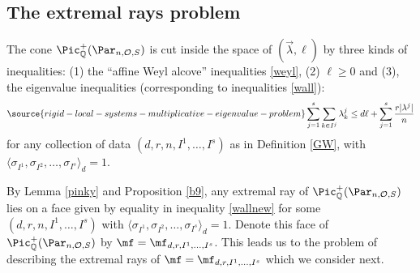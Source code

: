\subsection{The extremal rays problem}
The cone  $\Pic^+_{\Bbb{Q}}(\Par_{n,\mathcal{O},S})$ is cut inside the space of $(\vec{\lambda},\ell)$ by three kinds of inequalities: (1) the ``affine Weyl alcove''  inequalities \eqref{weyl}, (2)
$\ell\geq 0$ and (3), the eigenvalue inequalities (corresponding to inequalities \eqref{wall}):
\begin{equation}\label{wallnew}
\source{rigid-local-systems-multiplicative-eigenvalue-problem}
\sum_{j=1}^s\sum_{k\in I^j} \lambda^j_k\leq d\ell +\sum_{j=1}^s \frac{r|\lambda^j|}{n}
\end{equation}
for any collection of data
$(d,r,n,I^1,\dots,I^s)$ as in Definition \ref{GW}, with $\langle\sigma_{I^1}, \sigma_{I^2},\dots,\sigma_{I^s}\rangle_d= 1$.

By Lemma  \ref{pinky} and Proposition \ref{b9}, any extremal ray of $\Pic^+_{\Bbb{Q}}(\Par_{n,\mathcal{O},S})$ lies on a face given by equality in inequality
\eqref{wallnew}  for some $(d,r,n,I^1,\dots,I^s)$ with $\langle\sigma_{I^1}, \sigma_{I^2},\dots,\sigma_{I^s}\rangle_d= 1$. Denote this face of $\Pic^+_{\Bbb{Q}}(\Par_{n,\mathcal{O},S})$ by $\mf=\mf_{d,r,I^1,\dots,I^s}$. This leads us to the problem of describing  the extremal rays of  $\mf=\mf_{d,r,I^1,\dots,I^s}$ which we consider next.
